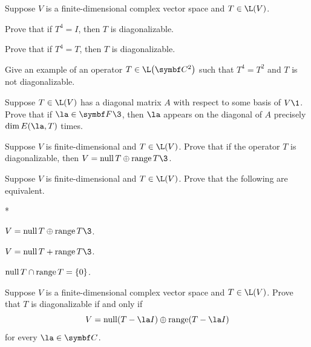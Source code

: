 \begin{exercises}

\exercise
Suppose $V$ is a finite-dimensional complex vector space and $T \in \L(V)$.
\begin{subtheorem}
\item
Prove that if $T^4 = I$, then $T$ is diagonalizable.
\item
Prove that if $T^4 = T$, then $T$ is diagonalizable.
\item
Give an example of an operator $T \in \L\paren[\big]{\C2}$ such that $T^4 = T^2$ and $T$ is not diagonalizable.
\end{subtheorem}
\exercisesubtheoremend


\exercise
Suppose $T \in \L(V)$ has a diagonal matrix $A$ with respect to some
basis of $V\1$. Prove that if $\la \in \F{}\3$, then $\la$ appears on the diagonal of $A$ precisely $\dim E(\la, T)$ times.


\exercise
Suppose $V$ is finite-dimensional and $T \in \L(V)$.
Prove that if the operator $T$ is diagonalizable, then $V = \ker T \oplus \ran T\3$.\label{5diagdir}


\exercise
Suppose $V$ is finite-dimensional and $T \in \L(V)$. Prove that the following are equivalent.\label{nullrandir}
\begin{subtheorem}*
\item
$V = \ker T \oplus \ran T\3$.
\item
$V = \ker T + \ran T\3$.
\item
$\operatorname{null} T \cap \operatorname{range} T = \{0\}$.
\end{subtheorem}
\exercisesubtheoremend

\exercise
Suppose $V$ is a finite-dimensional complex vector space and $T \in \L(V)$. Prove that $T$ is diagonalizable if and only if \label{diagKerRan}
\[
V = \ker(T - \la I) \oplus \ran(T - \la I)
\]
for every $\la \in \C{}$.

\end{exercises}
